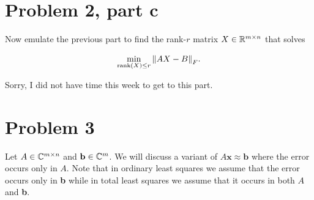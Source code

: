\newpage
\section{Problem 2, part c}
Now emulate the previous part to find the rank-$r$ matrix $X \in \mathbb{R}^{m \times n}$ that solves 

\[
\min_{\text{rank}(X) \leq r}\norm{AX - B}_F.
\]

\partbreak
\begin{solution}

    Sorry, I did not have time this week to get to this part.
\end{solution}
\newpage
\section{Problem 3}
Let $A \in \mathbb{C}^{m\times n}$ and $\textbf{b} \in \mathbb{C}^m$. We will discuss a variant of $A\textbf{x} \approx \textbf{b}$ where the error occurs only in $A$. Note that in ordinary least squares we assume that the error occurs only in \textbf{b} while in total least squares we assume that it occurs in both $A$ and \textbf{b}.


